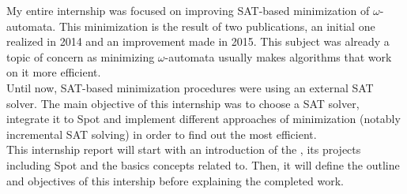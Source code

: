 My entire internship was focused on improving SAT-based minimization of $\omega$-automata. This minimization
is the result of two publications, an initial one realized in 2014 and an improvement made in 2015.
This subject was already a topic of concern as minimizing $\omega$-automata usually makes algorithms that
work on it more efficient.\\

Until now, SAT-based minimization procedures were using an external SAT solver. The main objective of this
internship was to choose a SAT solver, integrate it to Spot and implement different approaches of
minimization (notably incremental SAT solving) in order to find out the most efficient.\\

This internship report will start with an introduction of the \LRDE\space, its projects including Spot and
the basics concepts related to. Then, it will define the outline and objectives of this intership before
explaining the completed work.